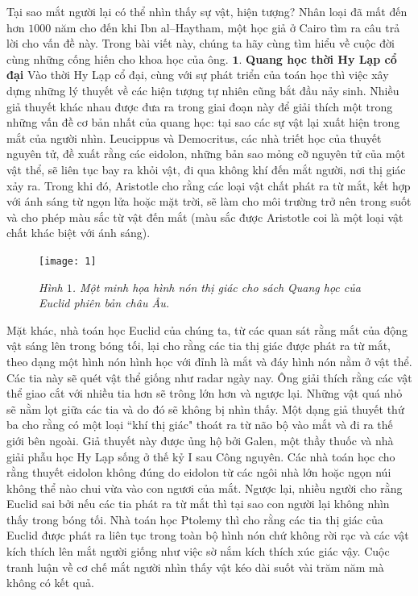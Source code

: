 \begin{multicols}{2}
	Tại sao mắt người lại có thể nhìn thấy sự vật, hiện tượng? Nhân loại đã mất đến hơn $1000$ năm cho đến khi Ibn al--Haytham, một học giả ở Cairo tìm ra câu trả lời cho vấn đề này. Trong bài viết này, chúng ta hãy cùng tìm hiểu về cuộc đời cùng những cống hiến cho khoa học của ông.
	\vskip 0.1cm
	$\pmb{1.}$ \textbf{\color{lichsutoanhoc}Quang học thời Hy Lạp cổ đại}
	\vskip 0.1cm
	Vào thời Hy Lạp cổ đại, cùng với sự phát triển của toán học thì việc xây dựng những lý thuyết về các hiện tượng tự nhiên cũng bắt đầu nảy sinh. Nhiều giả thuyết khác nhau được đưa ra trong giai đoạn này để giải thích một trong những vấn đề cơ bản nhất của quang học: tại sao các sự vật lại xuất hiện trong mắt của người nhìn.
	\vskip 0.1cm
	Leucippus và Democritus, các nhà triết học của thuyết nguyên tử, đề xuất rằng các eidolon, những bản sao mỏng cỡ nguyên tử của một vật thể, sẽ liên tục bay ra khỏi vật, đi qua không khí đến mắt người, nơi thị giác xảy ra. Trong khi đó, Aristotle cho rằng các loại vật chất phát ra từ mắt, kết hợp với ánh sáng từ ngọn lửa hoặc mặt trời, sẽ làm cho môi trường trở nên trong suốt và cho phép màu sắc từ vật đến mắt (màu sắc được Aristotle coi là một loại vật chất khác biệt với ánh sáng).
	\begin{figure}[H]
		\vspace*{5pt}
		\centering
		\captionsetup{labelformat= empty, justification=centering}
		\texttt{[image: 1]}
		\caption{\small\textit{\color{lichsutoanhoc}Hình $1$. Một minh họa hình nón thị giác cho sách Quang học của Euclid phiên bản châu Âu.}}
		\vspace*{-10pt}
	\end{figure}
	Mặt khác, nhà toán học Euclid của chúng ta, từ các quan sát rằng mắt của động vật sáng lên trong bóng tối, lại cho rằng các tia thị giác được phát ra từ mắt, theo dạng một hình nón hình học với đỉnh là mắt và đáy hình nón nằm ở vật thể. Các tia này sẽ quét vật thể giống như radar ngày nay. Ông giải thích rằng các vật thể giao cắt với nhiều tia hơn sẽ trông lớn hơn và ngược lại. Những vật quá nhỏ sẽ nằm lọt giữa các tia và do đó sẽ không bị nhìn thấy.
	\vskip 0.1cm
	Một dạng giả thuyết thứ ba cho rằng có một loại ``khí thị giác" thoát ra từ não bộ vào mắt và đi ra thế giới bên ngoài. Giả thuyết này được ủng hộ bởi Galen, một thầy thuốc và nhà giải phẫu học Hy Lạp sống ở thế kỷ I sau Công nguyên.
	\vskip 0.1cm
	Các nhà toán học cho rằng thuyết eidolon không đúng do eidolon từ các ngôi nhà lớn hoặc ngọn núi không thể nào chui vừa vào con ngươi của mắt. Ngược lại, nhiều người cho rằng Euclid sai bởi nếu các tia phát ra từ mắt thì tại sao con người lại không nhìn thấy trong bóng tối. Nhà toán học Ptolemy thì cho rằng các tia thị giác của Euclid được phát ra liên tục trong toàn bộ hình nón chứ không rời rạc và các vật kích thích lên mắt người giống như việc sờ nắm kích thích xúc giác vậy. Cuộc tranh luận về cơ chế mắt người nhìn thấy vật kéo dài suốt vài trăm năm mà không có kết quả. 

\end{multicols}

